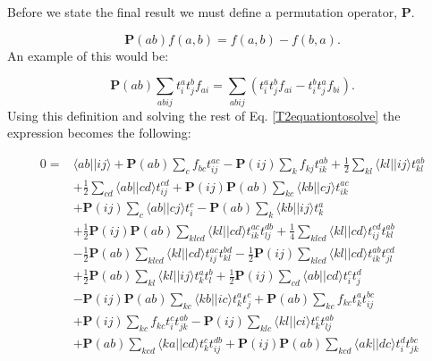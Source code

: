\documentclass[a4paper,norsk,11pt,twoside]{report}
\begin{document}
Before we state the final result we must define a permutation operator, $\textbf{P}$.

\begin{equation}
\textbf{P}(ab) f(a,b) = f(a,b) - f(b,a) .
\end{equation}
An example of this would be:

\begin{equation}
\textbf{P}(ab) \sum_{abij} t_i^a t_j^b f_{ai} = \sum_{abij} \left( t_i^a t_j^b f_{ai} - t_i^b t_j^a f_{bi} \right) .
\end{equation} 
Using this definition and solving the rest of Eq. \eqref{T2equationtosolve} the expression becomes the following:

\begin{align}
0 = & \langle ab || ij \rangle
+ \textbf{P}(ab) \sum_c f_{bc} t_{ij}^{ac}
- \textbf{P}(ij) \sum_k f_{kj} t_{ik}^{ab}
+ \frac{1}{2} \sum_{kl} \langle kl||ij \rangle t_{kl}^{ab} \label{T2equation} \\ &
+ \frac{1}{2} \sum_{cd} \langle ab || cd \rangle t_{ij}^{cd}
+ \textbf{P}(ij) \textbf{P}(ab) \sum_{kc}
\langle kb||cj \rangle t_{ik}^{ac} \nonumber \\ &
+ \textbf{P}(ij) \sum_c \langle ab || cj \rangle t_i^c
- \textbf{P}(ab) \sum_k \langle kb || ij \rangle t_k^a
\nonumber \\ &
+ \frac{1}{2} \textbf{P}(ij) \textbf{P}(ab) \sum_{klcd}
\langle kl || cd \rangle t_{ik}^{ac} t_{lj}^{db} 
+ \frac{1}{4} \sum_{klcd} \langle kl || cd \rangle
t_{ij}^{cd} t_{kl}^{ab} \nonumber \\ &
-  \frac{1}{2} \textbf{P}(ab)\sum_{klcd} \langle kl || cd \rangle t_{ij}^{ac} t_{kl}^{bd}
- \frac{1}{2} \textbf{P}(ij) \sum_{klcd} \langle kl || cd \rangle t_{ik}^{ab} t_{jl}^{cd} \nonumber \\ &
+ \frac{1}{2} \textbf{P}(ab) \sum_{kl}
\langle kl || ij \rangle t_k^a t_l^b 
+ \frac{1}{2} \textbf{P}(ij) \sum_{cd} \langle ab || cd \rangle t_i^c t_j^d \nonumber \\ &
- \textbf{P}(ij) \textbf{P}(ab) \sum_{kc} \langle kb || ic \rangle t_k^a t_j^c
+  \textbf{P}(ab) \sum_{kc} f_{kc} t_k^a t_{ij}^{bc} 
\nonumber \\ &
+ \textbf{P}(ij) \sum_{kc} f_{kc} t_i^c t_{jk}^{ab}
- \textbf{P}(ij) \sum_{klc} \langle kl || ci \rangle t_k^c t_{lj}^{ab}  \nonumber \\ &
+ \textbf{P} (ab) \sum_{kcd} \langle ka || cd \rangle t_k^c t_{ij}^{db} 
+ \textbf{P}(ij) \textbf{P}(ab) \sum_{kcd} \langle ak || dc \rangle t_i^d t_{jk}^{bc} \nonumber \\ &

\end{align}
\end{document}
